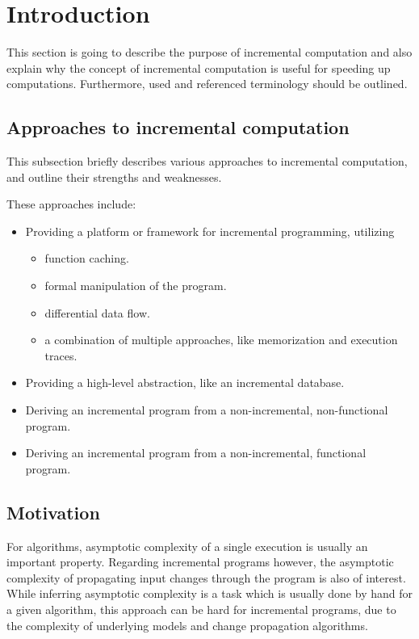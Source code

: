 \section{Introduction}
This section is going to describe the purpose of incremental computation and also explain why the concept of incremental computation is useful for speeding up computations. Furthermore, used and referenced terminology should be outlined.  

\subsection{Approaches to incremental computation}
This subsection briefly describes various approaches to incremental computation, and outline their strengths and weaknesses. 

These approaches include: 
\begin{itemize}
\item Providing a platform or framework for incremental programming, utilizing
\begin{itemize}
\item function caching. \cite{heydon2000caching} \cite{Pugh1989} 
\item formal manipulation of the program. \cite{cohen1991dynamic}
\item differential data flow. \cite{naiadIncremental}
\item a combination of multiple approaches, like memorization and execution traces.  \cite{Hammer2009} \cite{Chen2014} \cite{Acar2008} \cite{acar2006adaptive}   
\end{itemize}
\item Providing a high-level abstraction, like an incremental database. \cite{Peng2010}
\item Deriving an incremental program from a non-incremental, non-functional program. \cite{liu1995systematic} 
\item Deriving an incremental program from a non-incremental, functional program. \cite{ley2008compiling} 
\end{itemize}

\subsection{Motivation}

For algorithms, asymptotic complexity of a single execution is usually an important property. Regarding incremental programs however, the asymptotic complexity of propagating input changes through the program is also of interest. While inferring asymptotic complexity is a task which is usually done by hand for a given algorithm, this approach can be hard for incremental programs, due to the complexity of underlying models and change propagation algorithms. 

